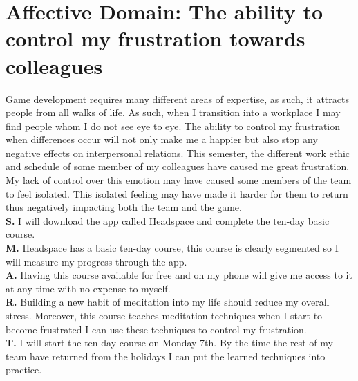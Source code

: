 \documentclass{scrartcl}
\begin{document}
\section{Affective Domain: The ability to control my frustration towards colleagues}
Game development requires many different areas of expertise, as such, it attracts people from all walks of life. As such, when I transition into a workplace I may find people whom I do not see eye to eye. The ability to control my frustration when differences occur will not only make me a happier but also stop any negative effects on interpersonal relations. This semester, the different work ethic and schedule of some member of my colleagues have caused me great frustration. My lack of control over this emotion may have caused some members of the team to feel isolated. This isolated feeling may have made it harder for them to return thus negatively impacting both the team and the game. \\
\textbf{S.}    I will download the app called Headspace and complete the ten-day basic course.\\
\textbf{M.}   Headspace has a basic ten-day course, this course is clearly segmented so I will measure my progress through the app.\\
\textbf{A.}   Having this course available for free and on my phone will give me access to it at any time with no expense to myself. \\
\textbf{R.}  Building a new habit of meditation into my life should reduce my overall stress. Moreover, this course teaches meditation techniques when I start to become frustrated I can use these techniques to control my frustration.\\
\textbf{T.}  I will start the ten-day course on Monday 7th. By the time the rest of my team have returned from the holidays I can put the learned techniques into practice.\\
\end{document}
